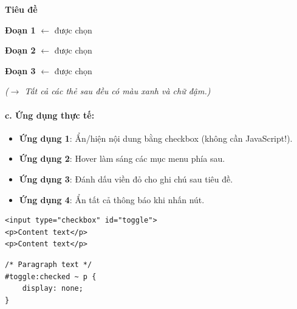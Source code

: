 \begin{browserWindow}
\sffamily\small
{\bfseries\Large\textcolor{darkText}{Tiêu đề}} \par\vspace{4pt}
\textcolor{primaryBlue}{\textbf{Đoạn 1}} {\small\textcolor{gray!60}{$\leftarrow$ được chọn}} \par\vspace{2pt}
\textcolor{primaryBlue}{\textbf{Đoạn 2}} {\small\textcolor{gray!60}{$\leftarrow$ được chọn}} \par\vspace{2pt}
\textcolor{primaryBlue}{\textbf{Đoạn 3}} {\small\textcolor{gray!60}{$\leftarrow$ được chọn}} \par\vspace{4pt}
\textcolor{gray!70}{\small\textit{($\rightarrow$ Tất cả các thẻ  sau  đều có màu xanh và chữ đậm.)}}
\end{browserWindow}

\paragraph{c. Ứng dụng thực tế:}

\begin{tipBox}
\begin{itemize}[leftmargin=1.5em, itemsep=3pt, parsep=0pt]
    \item \textbf{Ứng dụng 1}: Ẩn/hiện nội dung bằng checkbox (không cần JavaScript!).
    \item \textbf{Ứng dụng 2}: Hover làm sáng các mục menu phía sau.
    \item \textbf{Ứng dụng 3}: Đánh dấu viền đỏ cho ghi chú sau tiêu đề.
    \item \textbf{Ứng dụng 4}: Ẩn tất cả thông báo khi nhấn nút.
\end{itemize}
\end{tipBox}

\begin{codeWindow}
\begin{lstlisting}[language=HTML5]
<input type="checkbox" id="toggle">
<p>Content text</p>
<p>Content text</p>
\end{lstlisting}

\begin{lstlisting}[language=CSS3]
/* Paragraph text */
#toggle:checked ~ p {
    display: none;
}
\end{lstlisting}
\end{codeWindow}

